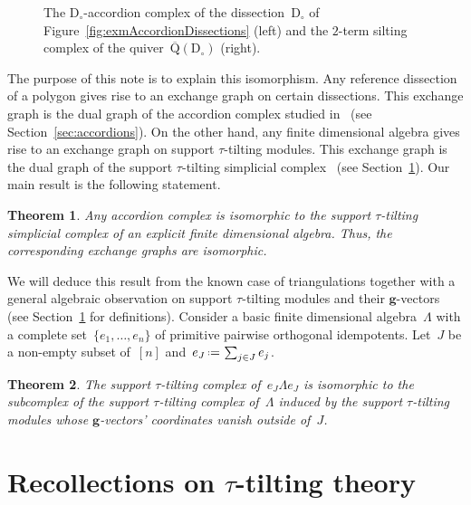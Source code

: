\documentclass{compositio}
\newtheorem{theorem}{Theorem}%
\theoremstyle{definition}
\renewcommand{\b}[1]{\mathbf{#1}} %
\newcommand{\eqdef}{\mbox{\,\raisebox{0.2ex}{\scriptsize\ensuremath{\mathrm:}}\ensuremath{=}\,}} %
\newcommand{\fref}[1]{Figure~\ref{#1}} %
\newcommand{\dissection}{\mathrm{D}} %
\newcommand{\quiver}{\mathrm{Q}} %
\begin{document}
\begin{figure}
	\capstart
	\centerline{\accordiohedronAccordionTikz{}\hspace{.8cm}\accordiohedronSiltingTikz{}}
	\caption{The $\dissection_\circ$-accordion complex of the dissection~$\dissection_\circ$ of \fref{fig:exmAccordionDissections} (left) and the $2$-term silting complex of the quiver~$\overline{\quiver}(\dissection_\circ)$ (right).}
	\label{fig:accordiohedron}
\end{figure}

The purpose of this note is to explain this isomorphism.
Any reference dissection of a polygon gives rise to an exchange graph on certain dissections.
This exchange graph is the dual graph of the accordion complex studied in~\cite{Chapoton-quadrangulations, GarverMcConville, MannevillePilaud-accordion} (see Section~\ref{sec:accordions}).
On the other hand, any finite dimensional algebra gives rise to an exchange graph on support $\tau$-tilting modules. This exchange graph is the dual graph of the support $\tau$-tilting simplicial complex~\cite{AdachiIyamaReiten} (see Section~\ref{sec:recollections}).
Our main result is the following statement.

\begin{theorem}
\label{thm:mainDissection}
Any accordion complex is isomorphic to the support $\tau$-tilting simplicial complex of an explicit finite dimensional algebra. Thus, the corresponding exchange graphs are isomorphic.
\end{theorem}

We will deduce this result from the known case of triangulations together with a general algebraic observation on support $\tau$-tilting modules and their $\b{g}$-vectors (see Section~\ref{sec:recollections} for definitions).
Consider a basic finite dimensional algebra~$\Lambda$ with a complete set~$\{e_1, \dots, e_n\}$ of primitive pairwise orthogonal idempotents. 
Let~$J$ be a non-empty subset of~$[n]$ and~$e_J \eqdef \sum_{j \in J} e_j$.


\begin{theorem}
\label{thm:mainAlgThm}
The support $\tau$-tilting complex of~$e_J \Lambda e_J$ is isomorphic to the subcomplex of the support $\tau$-tilting complex of~$\Lambda$ induced by the support $\tau$-tilting modules whose $\b{g}$-vectors' coordinates vanish outside of~$J$.
\end{theorem}


\section{Recollections on $\tau$-tilting theory}
\label{sec:recollections}
\end{document}
